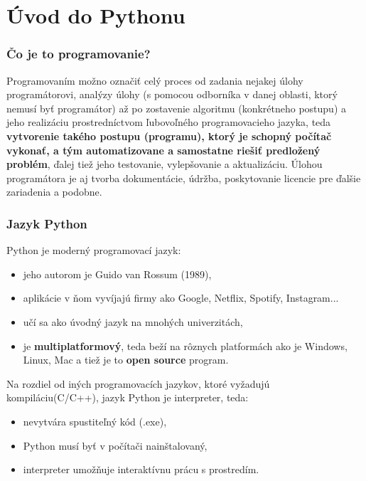 \documentclass[a4paper,11pt]{report}
\begin{document}
	
	\chapter{Úvod do Pythonu}
	
	\subsection*{Čo je to programovanie?}
	
	Programovaním možno označiť celý proces od zadania nejakej úlohy programátorovi, analýzy úlohy (s pomocou odborníka v danej oblasti, ktorý nemusí byť programátor) až po zostavenie algoritmu (konkrétneho postupu) a jeho realizáciu prostredníctvom ľubovoľného programovacieho jazyka, teda \textbf{vytvorenie takého postupu (programu), ktorý je schopný počítač vykonať, a tým automatizovane a samostatne riešiť predložený problém}, ďalej tiež jeho testovanie, vylepšovanie a aktualizáciu. Úlohou programátora je aj tvorba dokumentácie, údržba, poskytovanie licencie pre ďalšie zariadenia a podobne.
	
	\subsection*{Jazyk Python}
	Python je moderný programovací jazyk:
	\begin{itemize}
		\item jeho autorom je Guido van Rossum (1989),
		\item aplikácie v ňom vyvíjajú firmy ako Google, Netflix, Spotify, Instagram...
		\item učí sa ako úvodný jazyk na mnohých univerzitách,
		\item je \textbf{multiplatformový}, teda beží na rôznych platformách ako je Windows, Linux, Mac a tiež je to \textbf{open source} program.
	\end{itemize} 
	
	Na rozdiel od iných programovacích jazykov, ktoré vyžadujú kompiláciu(C/C++), jazyk Python je interpreter, teda:
	\begin{itemize}
		\item nevytvára spustiteľný kód (.exe),
		\item Python musí byť v počítači nainštalovaný,
		\item interpreter umožňuje interaktívnu prácu s prostredím.
	\end{itemize}
	
	\noindent{} \\
\end{document}
